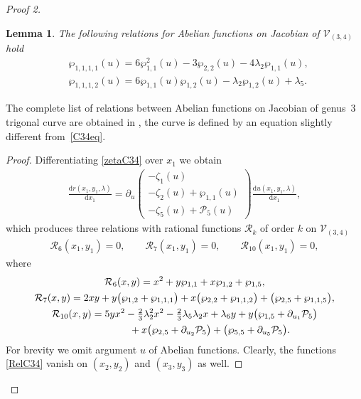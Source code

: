 \documentclass[11pt]{article}
\numberwithin{equation}{section}
\newtheorem{Lemma}[Theorem]{Lemma}
\newcommand{\rmd}{\mathrm{d}}
\begin{document}
\begin{proof}[Proof 2]
\begin{Lemma}\label{L:ind4WPC34}
The following relations for Abelian functions on Jacobian of $\mathcal{V}_{(3,4)}$ hold
\begin{subequations}\label{C34WP4rel}
\begin{align}
 &\wp_{1,1,1,1}(u) = 6 \wp_{1,1}^2(u)-3\wp_{2,2}(u) - 4 \lambda_2 \wp_{1,1}(u),\label{wp1111RelC34} \\
 &\wp_{1,1,1,2}(u) = 6\wp_{1,1}(u)\wp_{1,2}(u) - \lambda_2 \wp_{1,2}(u) + \lambda_5. \label{wp1112RelC34}
\end{align}
\end{subequations}
\end{Lemma}
\begin{Remark} The complete list of relations between Abelian functions on Jacobian of genus~$3$ trigonal curve are obtained in \cite{Eilb2011}, the curve is defined by an equation slightly different from~\eqref{C34eq}.
\end{Remark}
\begin{proof}Differentiating \eqref{zetaC34} over $x_1$ we obtain
\begin{gather*}
 \frac{\rmd r(x_1,y_1,\lambda)}{\rmd x_1} = \partial_{u} \begin{pmatrix}
 -\zeta_1(u) \\
 -\zeta_2(u) + \wp_{1,1}(u)\\
 -\zeta_5(u) + \mathcal{P}_5(u) \end{pmatrix} \frac{\rmd u(x_1,y_1,\lambda)}{\rmd x_1},
\end{gather*}
which produces three relations with rational functions $\mathcal{R}_k$ of order $k$ on $\mathcal{V}_{(3,4)}$
\begin{gather*}
 \mathcal{R}_6(x_1,y_1) = 0, \qquad \mathcal{R}_7(x_1,y_1) = 0, \qquad \mathcal{R}_{10}(x_1,y_1) = 0,
\end{gather*}
where
\begin{subequations}\label{RelC34}
 \begin{gather}
 \mathcal{R}_6(x,y) = x^2 + y \wp_{1,1} + x \wp_{1,2} + \wp_{1,5},\label{R6RelC34}\\
 \mathcal{R}_7(x,y) = 2 x y + y \big(\wp_{1,2} + \wp_{1,1,1}\big) + x \big(\wp_{2,2} + \wp_{1,1,2}\big)
 + \big(\wp_{2,5} + \wp_{1,1,5}\big), \label{R7RelC34}\\
 \mathcal{R}_{10}(x,y) = 5 y x^2 - \tfrac{2}{3} \lambda_2^2 x^2 - \tfrac{2}{3} \lambda_5 \lambda_2 x + \lambda_6 y + y \big(\wp_{1,5} + \partial_{u_1} \mathcal{P}_5\big) \notag\\
\hphantom{\mathcal{R}_{10}(x,y) =}{} + x \big(\wp_{2,5} + \partial_{u_2} \mathcal{P}_5\big) + \big(\wp_{5,5} + \partial_{u_5} \mathcal{P}_5\big).\label{R10RelC34}
 \end{gather}
\end{subequations}
For brevity we omit argument $u$ of Abelian functions. Clearly, the functions \eqref{RelC34} vanish on $(x_2,y_2)$ and $(x_3,y_3)$ as well.


\end{proof}
\end{proof}
\end{document}
